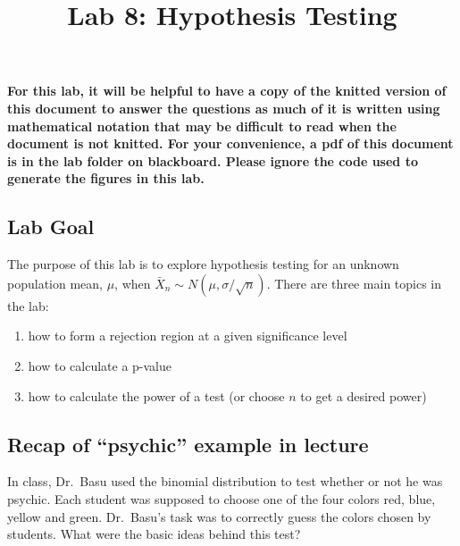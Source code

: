 \documentclass[]{article}
\title{Lab 8: Hypothesis Testing}
\author{}
\date{}
\providecommand{\tightlist}{%
  \setlength{\itemsep}{0pt}\setlength{\parskip}{0pt}}
\begin{document}
\maketitle

\textbf{For this lab, it will be helpful to have a copy of the knitted
version of this document to answer the questions as much of it is
written using mathematical notation that may be difficult to read when
the document is not knitted. For your convenience, a pdf of this
document is in the lab folder on blackboard. Please ignore the code used
to generate the figures in this lab.}

\hypertarget{lab-goal}{%
\subsection{Lab Goal}\label{lab-goal}}

The purpose of this lab is to explore hypothesis testing for an unknown
population mean, \(\mu\), when \(\bar X_n \sim N(\mu,\sigma/\sqrt{n})\).
There are three main topics in the lab:

\begin{enumerate}
\def\labelenumi{(\Roman{enumi})}
\tightlist
\item
  how to form a rejection region at a given significance level
\item
  how to calculate a p-value
\item
  how to calculate the power of a test (or choose \(n\) to get a desired
  power)
\end{enumerate}

\hypertarget{recap-of-psychic-example-in-lecture}{%
\subsection{Recap of ``psychic'' example in
lecture}\label{recap-of-psychic-example-in-lecture}}

In class, Dr.~Basu used the binomial distribution to test whether or not
he was psychic. Each student was supposed to choose one of the four
colors red, blue, yellow and green. Dr.~Basu's task was to correctly
guess the colors chosen by students. What were the basic ideas behind
this test?
\end{document}
